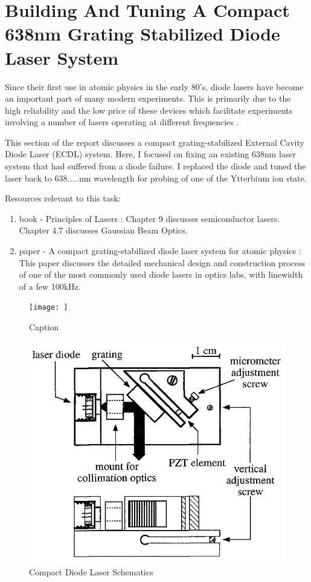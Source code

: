 \documentclass[12pt]{report}
\begin{document}
\chapter{Building And Tuning A Compact 638nm Grating Stabilized Diode Laser System}
Since their first use in atomic physics in the early 80's, diode lasers have become an important part of many modern experiments. This is primarily due to the high reliability and the low price of these devices which facilitate experiments involving a number of lasers operating at different frequencies \cite{compactGratingDiodeLaser}.
\par
This section of the report discusses a compact grating-stabilized External Cavity Diode Laser (ECDL) system. Here, I focused on fixing an existing 638nm laser system that had suffered from a diode failure. I replaced the diode and tuned the laser back to 638.....nm wavelength for probing of one of the Ytterbium ion state. 
\par
Resources relevant to this task: 
\begin{enumerate}
    \item book - Principles of Lasers \cite{principleOfLasersOrazio}: Chapter 9 discusses semiconductor lasers. Chapter 4.7 discusses Gaussian Beam Optics. 
    \item paper - A compact grating-stabilized diode laser system for atomic physics \cite{compactGratingDiodeLaser}: This paper discusses the detailed mechanical design and construction process of one of the most commonly used diode lasers in optics labs, with linewidth of a few 100kHz. 
\end{enumerate}

\begin{figure}
    \centering
    \texttt{[image: ]}
    \caption{Caption}
    \label{fig:my_label}
\end{figure}
\begin{figure}[H]
    \centering
    \includegraphics[width=.8\textwidth]{compactDiodeLaserSchematics.png}
    \caption{Compact Diode Laser Schematics}
    \label{fig:compactDiodeLaserSchematics}
\end{figure}
\end{document}
